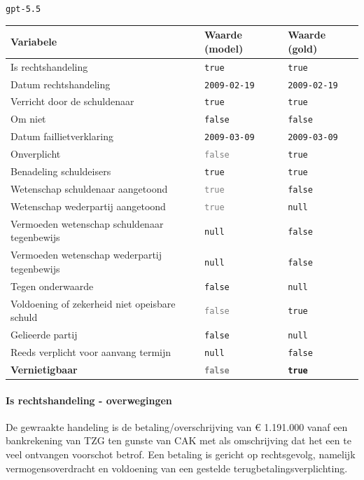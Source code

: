 \documentclass[
  dutch,
  a4paper,
]{article}
\begin{document}
\texttt{gpt-5.5}

\begin{center}
\small
\begin{tabular}{@{}p{7.4cm}p{2.6cm}p{2.6cm}@{}}
\toprule
Variabele & Waarde (model) & Waarde (gold) \\
\midrule
Is rechtshandeling & \texttt{true} & \texttt{true} \\
Datum rechtshandeling & \texttt{2009-02-19} & \texttt{2009-02-19} \\
Verricht door de schuldenaar & \texttt{true} & \texttt{true} \\
Om niet & \texttt{false} & \texttt{false} \\
Datum faillietverklaring & \texttt{2009-03-09} & \texttt{2009-03-09} \\
Onverplicht & \textcolor{gray}{\texttt{false}} & \texttt{true} \\
Benadeling schuldeisers & \texttt{true} & \texttt{true} \\
Wetenschap schuldenaar aangetoond & \textcolor{gray}{\texttt{true}} & \texttt{false} \\
Wetenschap wederpartij aangetoond & \textcolor{gray}{\texttt{true}} & \texttt{null} \\
Vermoeden wetenschap schuldenaar tegenbewijs & \texttt{null} & \texttt{false} \\
Vermoeden wetenschap wederpartij tegenbewijs & \texttt{null} & \texttt{false} \\
Tegen onderwaarde & \texttt{false} & \texttt{null} \\
Voldoening of zekerheid niet opeisbare schuld & \textcolor{gray}{\texttt{false}} & \texttt{true} \\
Gelieerde partij & \texttt{false} & \texttt{null} \\
Reeds verplicht voor aanvang termijn & \texttt{null} & \texttt{false} \\
\textbf{Vernietigbaar} & \textbf{\textcolor{gray}{\texttt{false}}} & \textbf{\texttt{true}} \\
\bottomrule
\end{tabular}
\end{center}

\paragraph{Is rechtshandeling - overwegingen}\label{is-rechtshandeling---overwegingen-85}

De gewraakte handeling is de betaling/overschrijving van € 1.191.000 vanaf een bankrekening van TZG ten gunste van CAK met als omschrijving dat het een te veel ontvangen voorschot betrof. Een betaling is gericht op rechtsgevolg, namelijk vermogensoverdracht en voldoening van een gestelde terugbetalingsverplichting.
\end{document}
